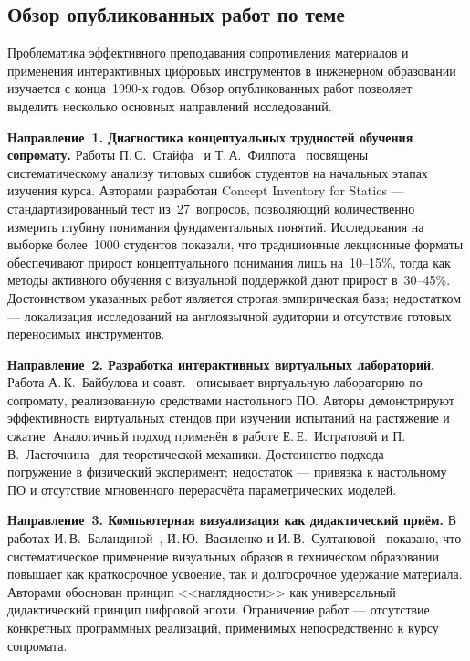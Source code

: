 \subsection*{Обзор опубликованных работ по теме}

Проблематика эффективного преподавания сопротивления материалов и применения интерактивных цифровых инструментов в инженерном образовании изучается с конца~1990-х годов. Обзор опубликованных работ позволяет выделить несколько основных направлений исследований.

\textbf{Направление~1. Диагностика концептуальных трудностей обучения сопромату.} Работы П.\,С.~Стайфа~\cite{steif2005} и Т.\,А.~Филпота~\cite{philpot2006} посвящены систематическому анализу типовых ошибок студентов на начальных этапах изучения курса. Авторами разработан Concept Inventory for Statics --- стандартизированный тест из~27~вопросов, позволяющий количественно измерить глубину понимания фундаментальных понятий. Исследования на выборке более~1000 студентов показали, что традиционные лекционные форматы обеспечивают прирост концептуального понимания лишь на~10--15\%, тогда как методы активного обучения с визуальной поддержкой дают прирост в~30--45\%. Достоинством указанных работ является строгая эмпирическая база; недостатком --- локализация исследований на англоязычной аудитории и отсутствие готовых переносимых инструментов.

\textbf{Направление~2. Разработка интерактивных виртуальных лабораторий.} Работа А.\,К.~Байбулова и соавт.~\cite{baybulov} описывает виртуальную лабораторию по сопромату, реализованную средствами настольного ПО. Авторы демонстрируют эффективность виртуальных стендов при изучении испытаний на растяжение и сжатие. Аналогичный подход применён в работе Е.\,Е.~Истратовой и П.\,В.~Ласточкина~\cite{istratova} для теоретической механики. Достоинство подхода --- погружение в физический эксперимент; недостаток --- привязка к настольному ПО и отсутствие мгновенного перерасчёта параметрических моделей.

\textbf{Направление~3. Компьютерная визуализация как дидактический приём.} В работах И.\,В.~Баландиной~\cite{balandina}, И.\,Ю.~Василенко и И.\,В.~Султановой~\cite{vasilenko} показано, что систематическое применение визуальных образов в техническом образовании повышает как краткосрочное усвоение, так и долгосрочное удержание материала. Авторами обоснован принцип <<наглядности>> как универсальный дидактический принцип цифровой эпохи. Ограничение работ --- отсутствие конкретных программных реализаций, применимых непосредственно к курсу сопромата.

